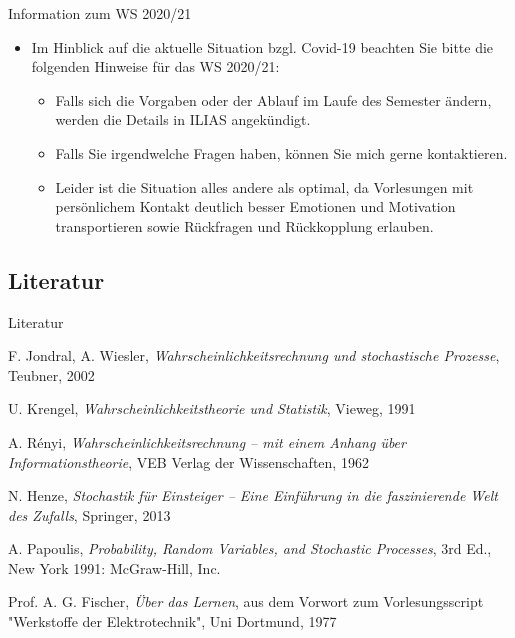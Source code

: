 \begin{frame}[c]{Information zum WS 2020/21}
	\begin{itemize}
		\item Im Hinblick auf die aktuelle Situation bzgl. Covid-19 beachten Sie bitte die folgenden Hinweise für das WS 2020/21:
		
		\begin{itemize}
			
			\item Falls sich die Vorgaben oder der Ablauf im Laufe des Semester ändern, werden die Details in ILIAS angekündigt.
			
			\item Falls Sie irgendwelche Fragen haben, können Sie mich gerne kontaktieren.
			
			\bigskip
			
			\item Leider ist die Situation alles andere als optimal, da Vorlesungen mit persönlichem Kontakt deutlich besser Emotionen und Motivation transportieren sowie Rückfragen und Rückkopplung erlauben. 

			
		\end{itemize}
	\end{itemize}

			
\end{frame}





\subsection{Literatur}


\begin{frame}{Literatur}
	\begin{thebibliography}{6}
		F. Jondral, A. Wiesler, \emph{Wahrscheinlichkeitsrechnung und stochastische Prozesse}, Teubner, 2002

		U. Krengel, \emph{Wahrscheinlichkeitstheorie und Statistik}, Vieweg, 1991

		A. Rényi, \emph{Wahrscheinlichkeitsrechnung -- mit einem Anhang über Informationstheorie}, VEB Verlag der Wissenschaften, 1962

		N. Henze, \emph{Stochastik für Einsteiger -- Eine Einführung in die faszinierende Welt des Zufalls}, Springer, 2013

		A. Papoulis, \emph{Probability, Random Variables, and Stochastic Processes}, 3rd Ed., New York 1991: McGraw-Hill, Inc.

		Prof. A. G. Fischer, \emph{Über das Lernen}, aus dem Vorwort zum Vorlesungsscript "Werkstoffe der Elektrotechnik", Uni Dortmund, 1977

	\end{thebibliography}
\end{frame}
